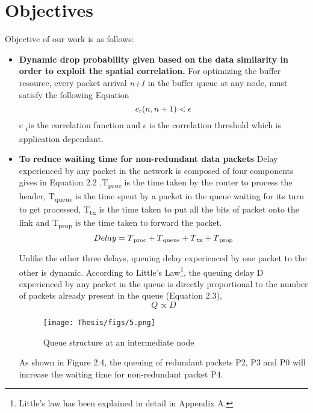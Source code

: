 \section{Objectives}
Objective of our work is as follows: 
\begin{itemize}
\item {\bf Dynamic drop probability given based on the data similarity in order to exploit the spatial correlation.} For optimizing the buffer resource, every packet arrival \textit{n+1} in the buffer queue at any node, must satisfy the following Equation
\begin{equation}
    c \textsubscript {r}(n,n+1)< \epsilon 
\end{equation}
c \textsubscript {r}is the correlation function and $\epsilon$ is the correlation threshold which is application dependant.
\item {\bf To reduce waiting time for non-redundant data packets} Delay experienced by any packet in the network is composed of four components gives in Equation 2.2 .T\textsubscript{proc} is the time taken by the router to process the header, T\textsubscript{queue} is the time spent by a packet in the queue waiting for its turn to get processed, T\textsubscript{tx} is the time taken to put all the bits of packet onto the link and T\textsubscript{prop} is the time taken to forward the packet.
\begin{equation}
    Delay = T\textsubscript{proc}+T\textsubscript{queue}+T\textsubscript{tx}+T\textsubscript{prop}
\end{equation}
\par Unlike the other three delays, queuing delay experienced by one packet to the other is dynamic. According to Little's Law\footnote{Little's law has been explained in detail in Appendix A.}, the queuing delay D experienced by any packet in the queue is directly proportional to the number of packets already present in the queue (Equation 2.3),  
\begin{equation}
    Q\propto D
\end{equation}

\begin{figure}[H]
    \centering
    \texttt{[image: Thesis/figs/5.png]}
    \caption{Queue structure at an intermediate node}
    \label{fig:my_label}
\end{figure}
As shown in Figure 2.4, the queuing of redundant packets P2, P3 and P0 will increase the waiting time for non-redundant packet P4.
\end{itemize}
